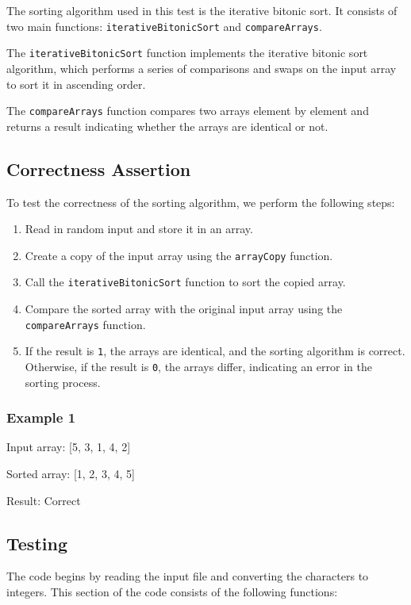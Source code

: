The sorting algorithm used in this test is the iterative bitonic sort. It consists of two main functions: \texttt{iterativeBitonicSort} and \texttt{compareArrays}.

The \texttt{iterativeBitonicSort} function implements the iterative bitonic sort algorithm, which performs a series of comparisons and swaps on the input array to sort it in ascending order.

The \texttt{compareArrays} function compares two arrays element by element and returns a result indicating whether the arrays are identical or not.

\subsection*{Correctness Assertion}

To test the correctness of the sorting algorithm, we perform the following steps:

\begin{enumerate}
  \item Read in random input and store it in an array.
  \item Create a copy of the input array using the \texttt{arrayCopy} function.
  \item Call the \texttt{iterativeBitonicSort} function to sort the copied array.
  \item Compare the sorted array with the original input array using the \texttt{compareArrays} function.
  \item If the result is \texttt{1}, the arrays are identical, and the sorting algorithm is correct. Otherwise, if the result is \texttt{0}, the arrays differ, indicating an error in the sorting process.
\end{enumerate}

\subsubsection*{Example 1}

Input array: [5, 3, 1, 4, 2]

Sorted array: [1, 2, 3, 4, 5]

Result: Correct
\subsection*{Testing}

The code begins by reading the input file and converting the characters to integers. This section of the code consists of the following functions:

